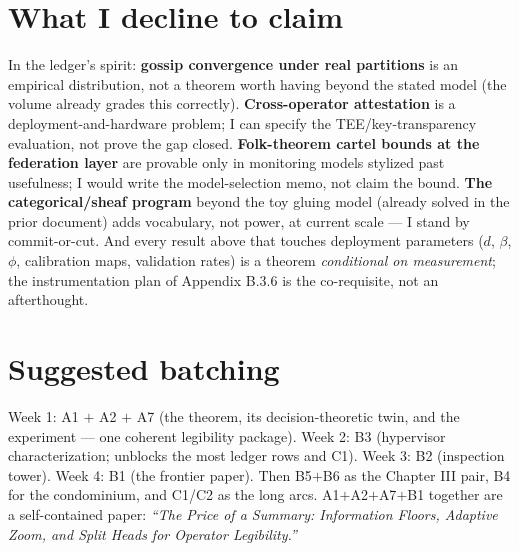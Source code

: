 \documentclass[11pt,a4paper]{article}
\begin{document}
\section{What I decline to claim}
In the ledger's spirit: \textbf{gossip convergence under real partitions} is an empirical distribution, not a theorem worth having beyond the stated model (the volume already grades this correctly). \textbf{Cross-operator attestation} is a deployment-and-hardware problem; I can specify the TEE/key-transparency evaluation, not prove the gap closed. \textbf{Folk-theorem cartel bounds at the federation layer} are provable only in monitoring models stylized past usefulness; I would write the model-selection memo, not claim the bound. \textbf{The categorical/sheaf program} beyond the toy gluing model (already solved in the prior document) adds vocabulary, not power, at current scale --- I stand by commit-or-cut. And every result above that touches deployment parameters ($d$, $\beta$, $\phi$, calibration maps, validation rates) is a theorem \emph{conditional on measurement}; the instrumentation plan of Appendix B.3.6 is the co-requisite, not an afterthought.

\section{Suggested batching}
Week 1: A1 $+$ A2 $+$ A7 (the theorem, its decision-theoretic twin, and the experiment --- one coherent legibility package). Week 2: B3 (hypervisor characterization; unblocks the most ledger rows and C1). Week 3: B2 (inspection tower). Week 4: B1 (the frontier paper). Then B5$+$B6 as the Chapter III pair, B4 for the condominium, and C1/C2 as the long arcs. A1$+$A2$+$A7$+$B1 together are a self-contained paper: \emph{``The Price of a Summary: Information Floors, Adaptive Zoom, and Split Heads for Operator Legibility.''}
\end{document}
